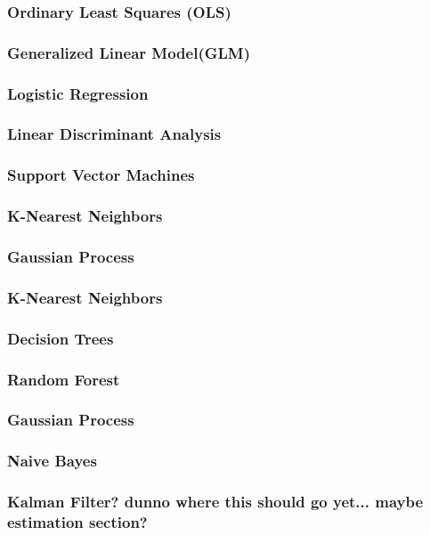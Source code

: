 \documentclass[11pt]{article}
\begin{document}
\subsubsection{Ordinary Least Squares (OLS)}
\subsubsection{Generalized Linear Model(GLM)}
\subsubsection{Logistic Regression}
\subsubsection{Linear Discriminant Analysis}
\subsubsection{Support Vector Machines}
\subsubsection{K-Nearest Neighbors}
\subsubsection{Gaussian Process}
\subsubsection{K-Nearest Neighbors}
\subsubsection{Decision Trees}
\subsubsection{Random Forest}
\subsubsection{Gaussian Process}
\subsubsection{Naive Bayes}
\subsubsection{Kalman Filter? dunno where this should go yet... maybe estimation section?}
\end{document}
